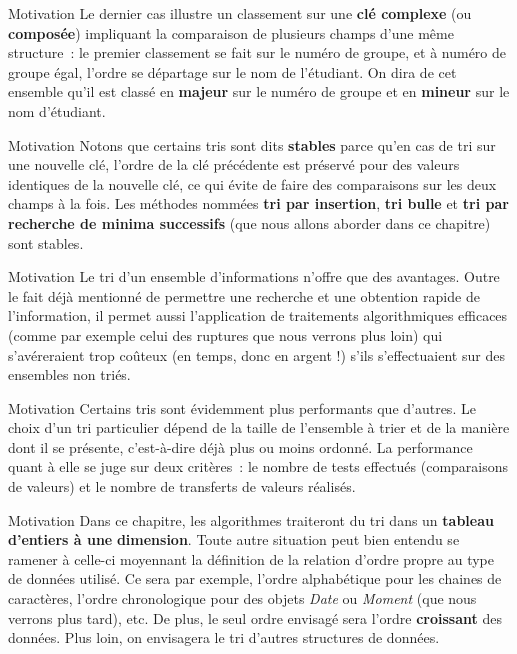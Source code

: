 \begin{frame}{Motivation}
		Le dernier cas illustre un classement sur une \textbf{clé complexe}
	(ou \textbf{composée}) impliquant la comparaison de plusieurs champs
	d’une même structure~: le premier classement se fait sur le numéro de
	groupe, et à numéro de groupe égal, l’ordre se départage sur le nom de
	l’étudiant. On dira de cet ensemble qu’il est classé en \textbf{majeur}
	sur le numéro de groupe et en \textbf{mineur} sur le nom d’étudiant.
\end{frame}

\begin{frame}{Motivation}
		Notons que certains tris sont dits \textbf{stables} parce
	qu'en cas de tri sur une nouvelle clé, l’ordre de la
	clé précédente est préservé pour des valeurs identiques de la nouvelle
	clé, ce qui évite de faire des comparaisons sur les deux champs à la
	fois. Les méthodes nommées \textbf{tri par insertion}, \textbf{tri
	bulle} et \textbf{tri par recherche de minima successifs }(que nous
	allons aborder dans ce chapitre) sont stables.
\end{frame}

\begin{frame}{Motivation}
	Le tri d’un ensemble d’informations n’offre que des avantages. Outre le
	fait déjà mentionné de permettre une recherche et une obtention rapide
	de l’information, il permet aussi l’application de traitements
	algorithmiques efficaces (comme par exemple celui des ruptures que nous
	verrons plus loin) qui s’avéreraient trop coûteux (en temps, donc en
	argent !) s’ils s’effectuaient sur des ensembles non triés.
\end{frame}

\begin{frame}{Motivation}
	Certains tris sont évidemment plus performants que d’autres. Le choix
	d’un tri particulier dépend de la taille de l’ensemble à trier et de la
	manière dont il se présente, c’est-à-dire déjà plus ou moins ordonné.
	La performance quant à elle se juge sur deux critères~: le nombre de
	tests effectués (comparaisons de valeurs) et le nombre de transferts de
	valeurs réalisés. 
\end{frame}

\begin{frame}{Motivation}
	Dans ce chapitre, les algorithmes traiteront du tri dans un
	\textbf{tableau d’entiers à une }\textbf{dimension}. Toute autre
	situation peut bien entendu se ramener à celle-ci moyennant la
	définition de la relation d’ordre propre au type de données utilisé. Ce
	sera par exemple, l’ordre alphabétique pour les chaines de caractères,
	l’ordre chronologique pour des objets \textit{Date} ou
	\textit{Moment} (que nous verrons
	plus tard), etc. De plus, le seul ordre envisagé sera l’ordre
	\textbf{croissant} des données. Plus loin, on envisagera le tri 
	d'autres structures de données.
\end{frame}

